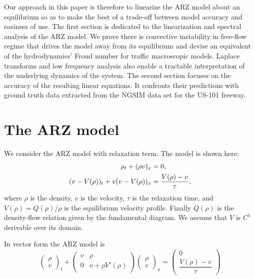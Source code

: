 \documentclass[a4paper, 10pt, conference]{ieeeconf}      %
\begin{document}
Our approach in this paper is therefore to linearize the ARZ model about an equilibrium so as to make the best of a trade-off between model accuracy and easiness of use. The first section is dedicated to the linearization and spectral analysis of the ARZ model. We prove there is convective instability in free-flow regime that drives the model away from its equilibrium and devise an equivalent of the hydrodynamics' Froud number for traffic macroscopic models. Laplace transforms and low frequency analysis also enable a tractable interpretation of the underlying dynamics of the system. The second section focuses on the accuracy of the resulting linear equations. It confronts their predictions with ground truth data extracted from the NGSIM data set for the US-101 freeway.

\section{The ARZ model} \label{ARZSection}

We consider the ARZ model with relaxation term. The model is shown here:
{\footnotesize
\begin{align} 
\footnotesize
\rho_t + (\rho v)_x &= 0, \label{ARZ1} \\
(v - V(\rho))_t + v(v - V(\rho))_x &=\dfrac{V(\rho) - v}{\tau} \label{ARZ2},
\end{align}
}
where $\rho$ is the density, $v$ is the velocity, $\tau$ is the relaxation time, and {\footnotesize$V(\rho) = Q(\rho)/\rho$} is the equilibrium velocity profile. Finally $Q(\rho)$ is the density-flow relation given by the fundamental diagram. We assume that $V$ is $C^{1}$ derivable over its domain.

In vector form the ARZ model is
{\footnotesize
\begin{equation} \label{ARZrhov}
\begin{pmatrix}
	\rho \\
	v
\end{pmatrix}_t
+ 
\begin{pmatrix}
	v & \rho \\
	0 & v + \rho V' (\rho)
\end{pmatrix}
\begin{pmatrix}
	\rho \\ 
	v
\end{pmatrix}_x = 
\begin{pmatrix}
	0 \\ 
	\dfrac{V(\rho) - v}{\tau}
\end{pmatrix}
\end{equation}
}
\end{document}
